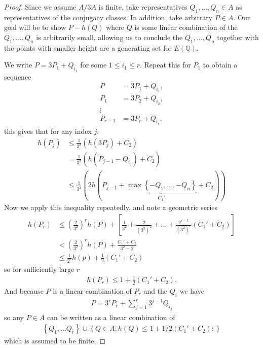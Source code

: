 \begin{proof}
  Since we assume $A/3A$ is finite, take representatives
  $Q_1, \dots, Q_n \in A$ as representatives of the conjugacy classes.
  In addition, take arbitrary $P \in A$.
  Our goal will be to show $P - h(Q)$
  where $Q$ is some linear combination of
  the $Q_1, \dots, Q_n$ is arbitrarily small,
  allowing us to conclude the
  $Q_1,\dots, Q_n$ together
  with the points with smaller height
  are a generating set for $E(\mathbb{Q})$.

  We write $P = 3P_1 + Q_{i_1}$ for some $1 \leq i_1 \leq r$.
  Repeat this for $P_1$ to obtain a sequence
  \begin{align*}
    P &= 3P_1 + Q_{i_1}, \\
    P_1 &= 3P_2 + Q_{i_2}, \\
    \vdots \\
    P_{r-1} &= 3P_{r} + Q_{i_r}.
  \end{align*}
  this gives that for any index $j$:
  \begin{align*}
    h(P_j) &\leq \frac{1}{3^2}(h(3P_j) + C_2) \\
           &= \frac{1}{3^2} \left( h(P_{j-1} - Q_{i_j}) + C_2 \right) \\
           &\leq \frac{1}{3^2} ( 2h(P_{j-1} + \underbrace{\max \left\{ -Q_1, \dots, -Q_n \right\}}_{C_1'} + C_2) )
  \end{align*}
  Now we apply this inequality repeatedly,
  and note a geometric series
  \begin{align*}
    h(P_r) &\leq \left( \frac{2}{3^2}  \right)^{r} h(P) + \left[ \frac{1}{3^2} + \frac{2}{(3^2)^2} + \dots + \frac{2^{r-1}}{(3^2)^{r}}(C_1'+C_2)   \right] \\
         &< \left( \frac{2}{3^2}  \right)^{r} h(P) + \frac{C_1' + C_2}{3^2 - 2}  \\
         &\leq \frac{1}{2^r} h(p) + \frac{1}{2} (C_1' + C_2)
  \end{align*}
  so for sufficiently large $r$
  \begin{align*}
    h(P_r) \leq 1 + \frac{1}{2} (C_1' + C_2).
  \end{align*}
  And because $P$ is a linear combination of $P_r$ and the $Q_i$ we have
  \begin{align*}
    P = 3^{r} P_r + \sum_{j=1}^{r} 3^{j-1} Q_{i_j}
  \end{align*}
  so any $P \in A$ can be written as a linear combination of
  \begin{align*}
    \left\{ Q_1, \dots Q_r \right\} \cup \left\{ Q \in A : h(Q) \leq 1 + 1/2(C_1' + C_2) :  \right\}
  \end{align*}
  which is assumed to be finite.
\end{proof}
